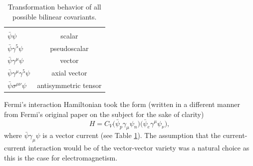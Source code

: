 \begin{table}[h]
  \caption{Transformation behavior of all possible bilinear covariants.} 
  \centering
  \begin{tabular}{l c }
    \hline \hline \\ [-1.75ex]
    $\bar{\psi}\psi$ & scalar \\ [0.50ex]
    $\bar{\psi}\gamma^5\psi$ & pseudoscalar \\ [0.50ex]
    $\bar{\psi}\gamma^{\mu}\psi$ & vector \\ [0.50ex]
    $\bar{\psi}\gamma^{\mu}\gamma^5\psi$ & axial vector \\ [0.50ex]
    $\bar{\psi}\sigma^{\mu\nu}\psi$ & antisymmetric tensor \\ [0.50ex]   
    \hline
  \end{tabular}
  \label{tab:bilinearCov}
\end{table}

Fermi's interaction Hamiltonian took the form (written in a different manner from Fermi's original
paper on the subject for the sake of clarity) 
%
\begin{equation}
  H = C_V\big( \bar{\psi}_p \gamma_\mu \psi_n \big) \big( \bar{\psi}_e \gamma^\mu \psi_\nu \big), 
\end{equation}
%
where $\bar{\psi} \gamma_\mu \psi$ is a vector current (see Table \ref{tab:bilinearCov}). The assumption
that the current-current interaction would be of the vector-vector variety was a natural
choice as this is the case for electromagnetism.


